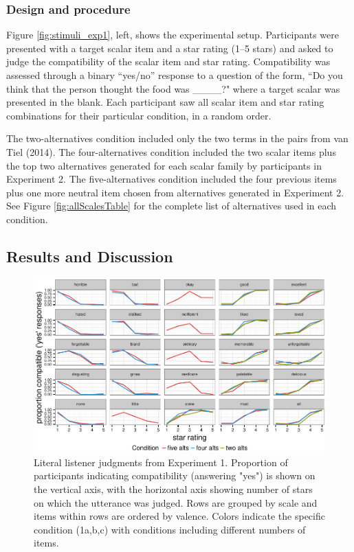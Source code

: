 \documentclass[10pt, letterpaper]{article}
\newenvironment{CodeChunk}{}{}
\begin{document}
\subsubsection{Design and procedure}\label{design-and-procedure}

Figure \ref{fig:stimuli_exp1}, left, shows the experimental setup.
Participants were presented with a target scalar item and a star rating
(1--5 stars) and asked to judge the compatibility of the scalar item and
star rating. Compatibility was assessed through a binary ``yes/no''
response to a question of the form, ``Do you think that the person
thought the food was \_\_\_\_?" where a target scalar was presented in
the blank. Each participant saw all scalar item and star rating
combinations for their particular condition, in a random order.

The two-alternatives condition included only the two terms in the pairs
from van Tiel (2014). The four-alternatives condition included the two
scalar items plus the top two alternatives generated for each scalar
family by participants in Experiment 2. The five-alternatives condition
included the four previous items plus one more neutral item chosen from
alternatives generated in Experiment 2. See Figure
\ref{fig:allScalesTable} for the complete list of alternatives used in
each condition.

\subsection{Results and Discussion}\label{results-and-discussion}

\begin{CodeChunk}
\captionsetup{width=0.8\textwidth}\begin{figure}[t]

{\centering \includegraphics{figs/exp1Plots-1} 

}

\caption[Literal listener judgments from Experiment 1]{Literal listener judgments from Experiment 1. Proportion of participants indicating compatibility (answering "yes") is shown on the vertical axis, with the horizontal axis showing number of stars on which the utterance was judged. Rows are grouped by scale and items within rows are ordered by valence. Colors indicate the specific condition (1a,b,c) with conditions including different numbers of items.}\label{fig:exp1Plots}
\end{figure}
\end{CodeChunk}
\end{document}
